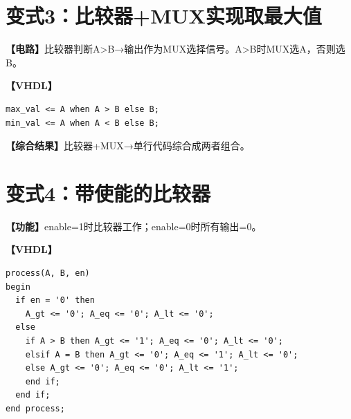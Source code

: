\section{变式3：比较器+MUX实现取最大值}

\begin{detailbox}[完整教学]
\textbf{【电路】}比较器判断A>B→输出作为MUX选择信号。A>B时MUX选A，否则选B。

\textbf{【VHDL】}
\begin{lstlisting}
max_val <= A when A > B else B;
min_val <= A when A < B else B;
\end{lstlisting}

\textbf{【综合结果】}比较器+MUX→单行代码综合成两者组合。
\end{detailbox}


\section{变式4：带使能的比较器}

\begin{detailbox}[完整教学]
\textbf{【功能】}enable=1时比较器工作；enable=0时所有输出=0。

\textbf{【VHDL】}
\begin{lstlisting}
process(A, B, en)
begin
  if en = '0' then
    A_gt <= '0'; A_eq <= '0'; A_lt <= '0';
  else
    if A > B then A_gt <= '1'; A_eq <= '0'; A_lt <= '0';
    elsif A = B then A_gt <= '0'; A_eq <= '1'; A_lt <= '0';
    else A_gt <= '0'; A_eq <= '0'; A_lt <= '1';
    end if;
  end if;
end process;
\end{lstlisting}
\end{detailbox}
